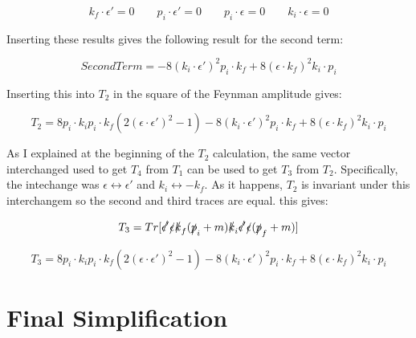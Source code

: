 \documentclass[a4]{article}
\begin{document}
    \begin{equation}
        k_f \cdot \epsilon' = 0 \qquad p_i \cdot \epsilon' = 0 \qquad p_i \cdot \epsilon = 0 \qquad k_i \cdot \epsilon = 0
    \end{equation}

    Inserting these results gives the following result for the second term:

    \begin{framed}
        \begin{equation}
            Second Term = -8 (k_i \cdot \epsilon')^2 p_i \cdot k_f + 8 (\epsilon \cdot k_f)^2 k_i \cdot p_i
        \end{equation}
    \end{framed}

    Inserting this into $T_2$ in the square of the Feynman amplitude gives:

    \begin{framed}
        \begin{equation}
            T_2 = 8 p_i \cdot k_i p_i \cdot k_f (2 (\epsilon \cdot \epsilon')^2 - 1) - 8 (k_i \cdot \epsilon')^2 p_i \cdot k_f + 8 (\epsilon \cdot k_f)^2 k_i \cdot p_i
        \end{equation}
    \end{framed}

    As I explained at the beginning of the $T_2$ calculation, the same vector interchanged used to get $T_4$ from $T_1$ can be used to get $T_3$ from $T_2$. Specifically,
    the intechange was $\epsilon \leftrightarrow \epsilon'$ and $k_i \leftrightarrow - k_f$. As it happens, $T_2$ is invariant under this interchangem so the second and
    third traces are equal. this gives:
    
    \begin{equation}
        T_3 = Tr [ \slashed{\epsilon'} \slashed{\epsilon} \slashed{k}_f (\slashed{p}_i + m) \slashed{k}_i \slashed{\epsilon'} \slashed{\epsilon} (\slashed{p}_f + m) ]
    \end{equation}

    \begin{framed}
        \begin{equation}
            T_3 = 8 p_i \cdot k_i p_i \cdot k_f (2 (\epsilon \cdot \epsilon')^2 - 1) - 8 (k_i \cdot \epsilon')^2 p_i \cdot k_f + 8 (\epsilon \cdot k_f)^2 k_i \cdot p_i
        \end{equation}
    \end{framed}

    \section*{Final Simplification}
    
\end{document}
